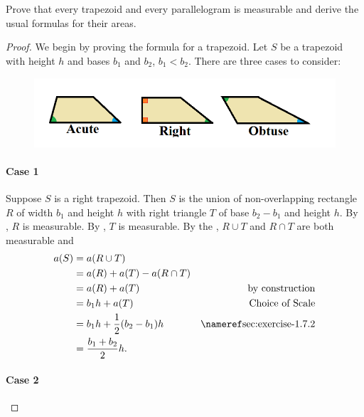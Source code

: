 \documentclass{report}
\begin{document}
\section{}%
\label{sec:exercise-1.7.3}

Prove that every trapezoid and every parallelogram is measurable and derive the
  usual formulas for their areas.

\begin{proof}

  We begin by proving the formula for a trapezoid.
  Let $S$ be a trapezoid with height $h$ and bases $b_1$ and $b_2$, $b_1 < b_2$.
  There are three cases to consider:

  \begin{figure}[h]
    \includegraphics[width=\textwidth]{trapezoid-cases}
    \centering
  \end{figure}

  \paragraph{Case 1}%

    Suppose $S$ is a right trapezoid.
    Then $S$ is the union of non-overlapping rectangle $R$ of width $b_1$ and
      height $h$ with right triangle $T$ of base $b_2 - b_1$ and height $h$.
    By , $R$ is measurable.
    By , $T$ is measurable.
    By the , $R \cup T$ and $R \cap T$ are
      both measurable and
      \begin{align*}
        a(S)
          & = a(R \cup T) \\
          & = a(R) + a(T) - a(R \cap T) \\
          & = a(R) + a(T) & \text{by construction} \\
          & = b_1h + a(T) & \text{Choice of Scale} \\
          & = b_1h + \frac{1}{2}(b_2 - b_1)h & \textref{sec:exercise-1.7.2} \\
          & = \frac{b_1 + b_2}{2}h.
      \end{align*}

  \paragraph{Case 2}%


\end{proof}
\end{document}
